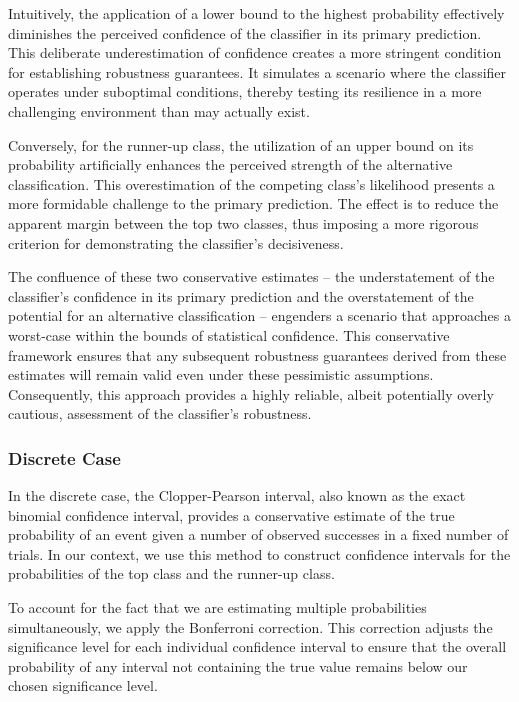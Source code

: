 Intuitively, the application of a lower bound to the highest probability effectively diminishes the perceived confidence of the classifier in its primary prediction.
This deliberate underestimation of confidence creates a more stringent condition for establishing robustness guarantees.
It simulates a scenario where the classifier operates under suboptimal conditions, thereby testing its resilience in a more challenging environment than may actually exist.

Conversely, for the runner-up class, the utilization of an upper bound on its probability artificially enhances the perceived strength of the alternative classification.
This overestimation of the competing class's likelihood presents a more formidable challenge to the primary prediction.
The effect is to reduce the apparent margin between the top two classes, thus imposing a more rigorous criterion for demonstrating the classifier's decisiveness.

The confluence of these two conservative estimates – the understatement of the classifier's confidence in its primary prediction and the overstatement of the potential for an alternative classification – engenders a scenario that approaches a worst-case within the bounds of statistical confidence.
This conservative framework ensures that any subsequent robustness guarantees derived from these estimates will remain valid even under these pessimistic assumptions.
Consequently, this approach provides a highly reliable, albeit potentially overly cautious, assessment of the classifier's robustness.

\subsubsection{Discrete Case}\label{subsubsec:discrete-case}
In the discrete case, the Clopper-Pearson interval, also known as the exact binomial confidence interval, provides a conservative estimate of the true probability of an event given a number of observed successes in a fixed number of trials.
In our context, we use this method to construct confidence intervals for the probabilities of the top class and the runner-up class.

To account for the fact that we are estimating multiple probabilities simultaneously, we apply the Bonferroni correction.
This correction adjusts the significance level for each individual confidence interval to ensure that the overall probability of any interval not containing the true value remains below our chosen significance level.

